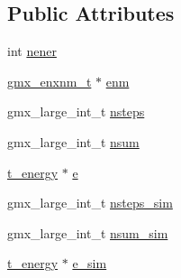 \subsection*{\-Public \-Attributes}
\begin{DoxyCompactItemize}
\item 
int \hyperlink{structt__ebin_abb690ba38825fcadb2b1aa38b75b75c8}{nener}
\item 
\hyperlink{structgmx__enxnm__t}{gmx\-\_\-enxnm\-\_\-t} $\ast$ \hyperlink{structt__ebin_a0f3a8bbf9b73af6e1b210b80bf76c4fb}{enm}
\item 
gmx\-\_\-large\-\_\-int\-\_\-t \hyperlink{structt__ebin_acc8d230d4621e597634dc437e079be75}{nsteps}
\item 
gmx\-\_\-large\-\_\-int\-\_\-t \hyperlink{structt__ebin_a2884d8733e4e9fb8c7ffdc6746f6fe99}{nsum}
\item 
\hyperlink{structt__energy}{t\-\_\-energy} $\ast$ \hyperlink{structt__ebin_a6ad706f7a36342286bd8009e005e94d3}{e}
\item 
gmx\-\_\-large\-\_\-int\-\_\-t \hyperlink{structt__ebin_af2553f80cc1b7109b5123f93ca7616c4}{nsteps\-\_\-sim}
\item 
gmx\-\_\-large\-\_\-int\-\_\-t \hyperlink{structt__ebin_aff2fa75369d9b826882d702d943c0a48}{nsum\-\_\-sim}
\item 
\hyperlink{structt__energy}{t\-\_\-energy} $\ast$ \hyperlink{structt__ebin_adc24591c3ca9e82eb0666cc43f07351d}{e\-\_\-sim}
\end{DoxyCompactItemize}


